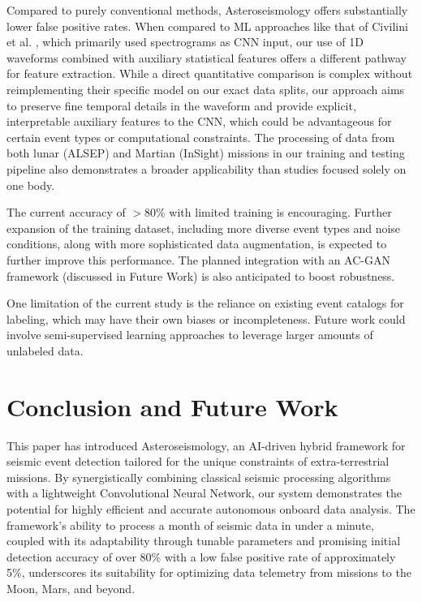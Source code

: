 \documentclass[conference]{IEEEtran}
\begin{document}
Compared to purely conventional methods, Asteroseismology offers substantially lower false positive rates. When compared to ML approaches like that of Civilini et al. \cite{favPaper}, which primarily used spectrograms as CNN input, our use of 1D waveforms combined with auxiliary statistical features offers a different pathway for feature extraction. While a direct quantitative comparison is complex without reimplementing their specific model on our exact data splits, our approach aims to preserve fine temporal details in the waveform and provide explicit, interpretable auxiliary features to the CNN, which could be advantageous for certain event types or computational constraints. The processing of data from both lunar (ALSEP) and Martian (InSight) missions in our training and testing pipeline also demonstrates a broader applicability than studies focused solely on one body.

The current accuracy of $>$80\% with limited training is encouraging. Further expansion of the training dataset, including more diverse event types and noise conditions, along with more sophisticated data augmentation, is expected to further improve this performance. The planned integration with an AC-GAN framework (discussed in Future Work) is also anticipated to boost robustness.

One limitation of the current study is the reliance on existing event catalogs for labeling, which may have their own biases or incompleteness. Future work could involve semi-supervised learning approaches to leverage larger amounts of unlabeled data.

\section{Conclusion and Future Work}
\label{sec:conclusion}
This paper has introduced Asteroseismology, an AI-driven hybrid framework for seismic event detection tailored for the unique constraints of extra-terrestrial missions. By synergistically combining classical seismic processing algorithms with a lightweight Convolutional Neural Network, our system demonstrates the potential for highly efficient and accurate autonomous onboard data analysis. The framework's ability to process a month of seismic data in under a minute, coupled with its adaptability through tunable parameters and promising initial detection accuracy of over 80\% with a low false positive rate of approximately 5\%, underscores its suitability for optimizing data telemetry from missions to the Moon, Mars, and beyond.
\end{document}
